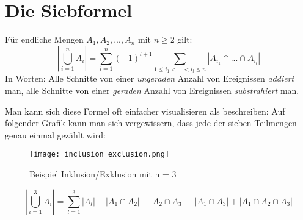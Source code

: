 \chapter{Die Siebformel}

\begin{satz}
    Für endliche Mengen $A_1, A_2, ... , A_n$ mit $ n \geq 2$ gilt:
    $$\left\lvert \bigcup^{n}_{i = 1} A_i \right\rvert = \sum_{l = 1}^{n}(-1)^{l+1} \sum_{1 \leq i_1 < ... < i_l \leq n} \left\lvert A_{i_1} \cap ... \cap A_{i_l}\right\rvert$$
    In Worten: Alle Schnitte von einer \textit{ungeraden} Anzahl von Ereignissen \textit{addiert} man, alle Schnitte
    von einer \textit{geraden} Anzahl von Ereignissen \textit{substrahiert} man.
\end{satz}
\bigskip

Man kann sich diese Formel oft einfacher visualisieren als beschreiben: Auf folgender Grafik
kann man sich vergewissern, dass jede der sieben Teilmengen genau einmal gezählt wird:

\begin{figure}[h]
    \centering
    \texttt{[image: inclusion\_exclusion.png]}
    \caption{Beispiel Inklusion/Exklusion mit n = 3}
\end{figure}

$$\left\lvert \bigcup^{3}_{i = 1} A_i \right\rvert = \sum_{l = 1}^{3}\left\lvert A_l\right\rvert - \left\lvert A_1 \cap A_2 \right\rvert - \left\lvert A_2 \cap A_3 \right\rvert - \left\lvert A_1 \cap A_3 \right\rvert + \left\lvert A_1 \cap A_2 \cap A_3\right\rvert$$
